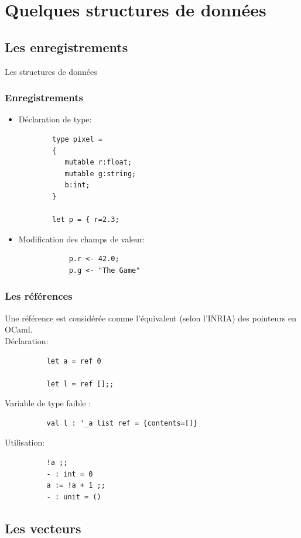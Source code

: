 
\section{Quelques structures de données}
\subsection{Les enregistrements}

\begin{frame}
	\begin{center}
		\huge 
		Les structures de données
	\end{center}
\end{frame}


\begin{frame}[fragile]
	\frametitle{Enregistrements}
	\begin{itemize}
	\item Déclaration de type: 
		\begin{lstlisting}
		type pixel = 
		{ 
		   mutable r:float; 
		   mutable g:string; 
		   b:int;
		} 
		
		let p = { r=2.3; 
		\end{lstlisting}
	\item Modification des champs de valeur:
		\begin{lstlisting}
			p.r <- 42.0;
			p.g <- "The Game"
		\end{lstlisting}
	\end{itemize}
\end{frame}


\begin{frame}[fragile]
	\frametitle{Les références}
	Une référence est considérée comme l'équivalent (selon l'INRIA) des pointeurs en OCaml.\\
	Déclaration:
	\begin{lstlisting}
		  let a = ref 0

		  let l = ref [];;
	\end{lstlisting}
	Variable de type faible :
	\begin{lstlisting}
		  val l : '_a list ref = {contents=[]}
	\end{lstlisting}
	Utilisation:
	\begin{lstlisting}
		  !a ;;
		  - : int = 0
		  a := !a + 1 ;;
		  - : unit = ()
	\end{lstlisting}

\end{frame}

\subsection{Les vecteurs}

